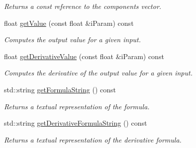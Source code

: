 \begin{DoxyCompactItemize}
\begin{DoxyCompactList}\small\item\em Returns a const reference to the components vector. \end{DoxyCompactList}\item 
\hypertarget{class_polynomial_data_ab04af5acc429792d65564a05b677aac1}{float \hyperlink{class_polynomial_data_ab04af5acc429792d65564a05b677aac1}{get\-Value} (const float \&i\-Param) const }\label{class_polynomial_data_ab04af5acc429792d65564a05b677aac1}

\begin{DoxyCompactList}\small\item\em Computes the output value for a given input. \end{DoxyCompactList}\item 
\hypertarget{class_polynomial_data_a8a5e239056596df41ff680e553b04f78}{float \hyperlink{class_polynomial_data_a8a5e239056596df41ff680e553b04f78}{get\-Derivative\-Value} (const float \&i\-Param) const }\label{class_polynomial_data_a8a5e239056596df41ff680e553b04f78}

\begin{DoxyCompactList}\small\item\em Computes the derivative of the output value for a given input. \end{DoxyCompactList}\item 
\hypertarget{class_polynomial_data_a5ef4f78a9e1e486ada0c97876a81c346}{std\-::string \hyperlink{class_polynomial_data_a5ef4f78a9e1e486ada0c97876a81c346}{get\-Formula\-String} () const }\label{class_polynomial_data_a5ef4f78a9e1e486ada0c97876a81c346}

\begin{DoxyCompactList}\small\item\em Returns a textual representation of the formula. \end{DoxyCompactList}\item 
\hypertarget{class_polynomial_data_a245b3a198847a4f393e9017f428bb52b}{std\-::string \hyperlink{class_polynomial_data_a245b3a198847a4f393e9017f428bb52b}{get\-Derivative\-Formula\-String} () const }\label{class_polynomial_data_a245b3a198847a4f393e9017f428bb52b}

\begin{DoxyCompactList}\small\item\em Returns a textual representation of the derivative formula. \end{DoxyCompactList}\end{DoxyCompactItemize}
